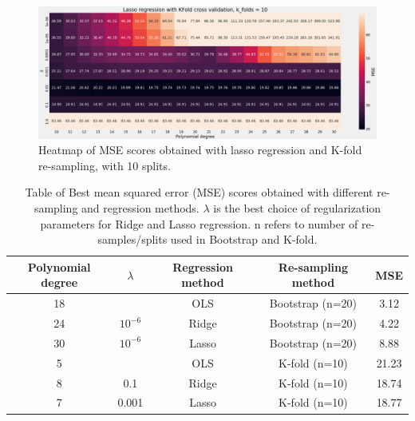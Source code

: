 \begin{figure}[H]
    \centering
    \includegraphics[width=\textwidth]{Figures/g_lasso_heatmap_kfold_n_10.png}
    \caption{Heatmap of MSE scores obtained with lasso regression and K-fold
    re-sampling, with 10 splits.}  
    \label{fig:g_lasso_boots_heatmap}  
\end{figure}



\begin{table}
    \centering
    \caption{Table of Best mean squared error (MSE) scores obtained with
        different re-sampling and regression
        methods. $\lambda $ is the best choice of regularization parameters for
        Ridge and Lasso regression. n refers to number of re-samples/splits used in
        Bootstrap and K-fold.}  
    \label{tab:terrain_mse_best} 
    \begin{tabular}{|c|c|c|c|c|}
        \hline
        Polynomial degree & $\lambda$ & Regression method & Re-sampling method & MSE \\
        \hline
                          18 &   &  OLS & Bootstrap (n=20) & 3.12\\
        \hline

                          24 & $10^{-6}$ &   Ridge & Bootstrap (n=20) & 4.22\\
        \hline

                          30 &  $10^{-6}$ & Lasso&  Bootstrap (n=20) & 8.88\\
        \hline

                          5 &  & OLS & K-fold (n=10)& 21.23\\
        \hline

                          8 &  0.1 & Ridge & K-fold (n=10)& 18.74\\ %
        \hline
                          7 & 0.001 &  Lasso & K-fold (n=10)& 18.77\\ %
        \hline
    \end{tabular} 
\end{table}

